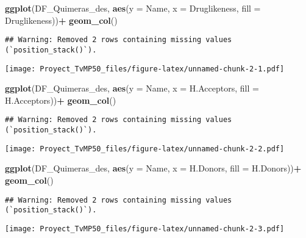 \documentclass[
]{article}
\newenvironment{Shaded}{\begin{snugshade}}{\end{snugshade}}
\newcommand{\AttributeTok}[1]{\textcolor[rgb]{0.13,0.29,0.53}{#1}}
\newcommand{\FunctionTok}[1]{\textcolor[rgb]{0.13,0.29,0.53}{\textbf{#1}}}
\newcommand{\NormalTok}[1]{#1}
\newcommand{\SpecialCharTok}[1]{\textcolor[rgb]{0.81,0.36,0.00}{\textbf{#1}}}
\begin{document}
\begin{Shaded}
\begin{Highlighting}[]
\FunctionTok{ggplot}\NormalTok{(DF\_Quimeras\_des, }\FunctionTok{aes}\NormalTok{(}\AttributeTok{y =}\NormalTok{ Name, }\AttributeTok{x =}\NormalTok{ Druglikeness, }\AttributeTok{fill =}\NormalTok{ Druglikeness))}\SpecialCharTok{+}
  \FunctionTok{geom\_col}\NormalTok{()}
\end{Highlighting}
\end{Shaded}

\begin{verbatim}
## Warning: Removed 2 rows containing missing values (`position_stack()`).
\end{verbatim}

\texttt{[image: Proyect\_TvMP50\_files/figure-latex/unnamed-chunk-2-1.pdf]}

\begin{Shaded}
\begin{Highlighting}[]
\FunctionTok{ggplot}\NormalTok{(DF\_Quimeras\_des, }\FunctionTok{aes}\NormalTok{(}\AttributeTok{y =}\NormalTok{ Name, }\AttributeTok{x =}\NormalTok{ H.Acceptors, }\AttributeTok{fill =}\NormalTok{  H.Acceptors))}\SpecialCharTok{+}
  \FunctionTok{geom\_col}\NormalTok{()}
\end{Highlighting}
\end{Shaded}

\begin{verbatim}
## Warning: Removed 2 rows containing missing values (`position_stack()`).
\end{verbatim}

\texttt{[image: Proyect\_TvMP50\_files/figure-latex/unnamed-chunk-2-2.pdf]}

\begin{Shaded}
\begin{Highlighting}[]
\FunctionTok{ggplot}\NormalTok{(DF\_Quimeras\_des, }\FunctionTok{aes}\NormalTok{(}\AttributeTok{y =}\NormalTok{ Name, }\AttributeTok{x =}\NormalTok{ H.Donors, }\AttributeTok{fill =}\NormalTok{  H.Donors))}\SpecialCharTok{+}
  \FunctionTok{geom\_col}\NormalTok{()}
\end{Highlighting}
\end{Shaded}

\begin{verbatim}
## Warning: Removed 2 rows containing missing values (`position_stack()`).
\end{verbatim}

\texttt{[image: Proyect\_TvMP50\_files/figure-latex/unnamed-chunk-2-3.pdf]}
\end{document}
